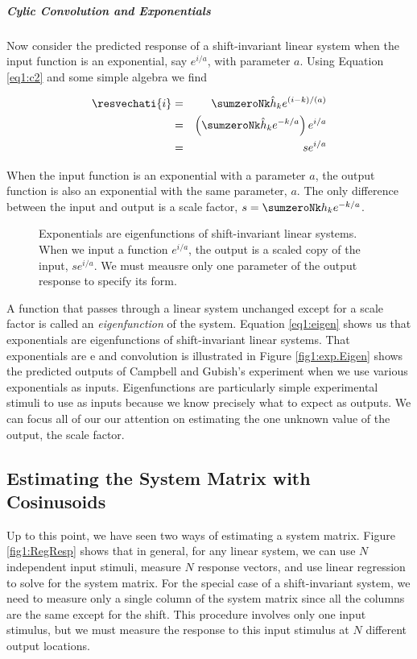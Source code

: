 
\subparagraph{Cylic Convolution and Exponentials}

Now consider the predicted response of a shift-invariant linear
system when the input function is an exponential,
say $e^{i / a}$, with parameter $a$.
Using Equation \ref{eq1:c2} and some simple
algebra we find 

\begin{eqnarray}
\label{eq1:eigen}
\resvechati{i}  & = & 
   \sumzeroNk \hat{h}_ k e^{ (i - k)/(a) } \nonumber \\
      & = & \left ( \sumzeroNk \hat{h}_k e ^ { - k / a } \right ) e ^ {i / a } \\
      & = & s e ^ { i / a }
\end{eqnarray}

When the input function is an exponential with a parameter $a$, 
the output
function is also an exponential with the
same parameter, $a$.
The only difference between the input and output is
a scale factor, $s = \sumzeroNk h _k e ^ { - k / a} $.

\begin{figure}
\centerline {
}
\caption[]{
Exponentials are eigenfunctions of shift-invariant
linear systems.
When we input a function $e^{i/a}$, the output is a scaled
copy of the input, $s e^{i/a}$.
We must meausre only one parameter of the output response
to specify its form.
}
\label{fig1:expEigen}
\end{figure}

A function that passes through a linear system
unchanged except for a scale factor
is called an {\em eigenfunction} of the system.
Equation \ref{eq1:eigen}
shows us that exponentials
are eigenfunctions of shift-invariant linear systems.
That exponentials are e
and convolution is illustrated in 
Figure \ref{fig1:exp.Eigen}
shows the predicted outputs of Campbell and Gubish's
experiment when we use various exponentials as inputs.
Eigenfunctions are particularly simple experimental stimuli 
to use as inputs because we know precisely what to
expect as outputs.
We can focus all of our 
our attention on estimating the one unknown value of the output,
the scale factor.




\subsection{Estimating the System Matrix with Cosinusoids}

Up to this point, we have seen two ways of
estimating a system matrix.
Figure \ref{fig1:RegResp} shows that in general,
for any linear system,
we can use $N$ independent input stimuli, 
measure $N$ response vectors, and use linear regression
to solve for the system matrix.
For the special case of a shift-invariant system, we need
to measure only a single column of the system matrix
since all the columns are the same except for the shift.
This procedure involves only one input stimulus, but we
must measure the response to this input stimulus at
$N$ different output locations.

